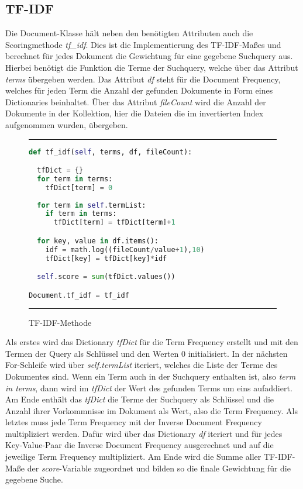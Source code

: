 \subsection{TF-IDF}\label{tf-idf}

Die Document-Klasse hält neben den benötigten Attributen auch die Scoringmethode \textit{tf\_idf}. Dies ist die Implementierung des TF-IDF-Maßes und berechnet für jedes Dokument die Gewichtung für eine gegebene Suchquery aus. Hierbei benötigt die Funktion die Terme der Suchquery, welche über das Attribut \textit{terms} übergeben werden. Das Attribut \textit{df} steht für die Document Frequency, welches für jeden Term die Anzahl der gefunden Dokumente in Form eines Dictionaries beinhaltet. Über das Attribut \textit{fileCount} wird die Anzahl der Dokumente in der Kollektion, hier die Dateien die im invertierten Index aufgenommen wurden, übergeben.

\begin{figure}[h]
	\rule{\textwidth}{0.4pt}
		\begin{lstlisting}[language=Python]
def tf_idf(self, terms, df, fileCount):

  tfDict = {}
  for term in terms:
    tfDict[term] = 0  
  
  for term in self.termList:
    if term in terms:
      tfDict[term] = tfDict[term]+1

  for key, value in df.items():
    idf = math.log((fileCount/value+1),10)
    tfDict[key] = tfDict[key]*idf

  self.score = sum(tfDict.values())

Document.tf_idf = tf_idf
		\end{lstlisting}
	\rule{\textwidth}{0.4pt}
	\caption{TF-IDF-Methode}
	\label{fig:tfidf}
\end{figure}

Als erstes wird das Dictionary \textit{tfDict} für die Term Frequency erstellt und mit den Termen der Query als Schlüssel und den Werten 0 initialisiert. In der nächsten For-Schleife wird über \textit{self.termList} iteriert, welches die Liste der Terme des Dokumentes sind. Wenn ein Term auch in der Suchquery enthalten ist, also \textit{term in terms}, dann wird im \textit{tfDict} der Wert des gefunden Terms um eins aufaddiert. Am Ende enthält das \textit{tfDict} die Terme der Suchquery als Schlüssel und die Anzahl ihrer Vorkommnisse im Dokument als Wert, also die Term Frequency. Als letztes muss jede Term Frequency mit der Inverse Document Frequency multipliziert werden. Dafür wird über das Dictionary \textit{df} iteriert und für jedes Key-Value-Paar die Inverse Document Frequency ausgerechnet und auf die jeweilige Term Frequency multipliziert. Am Ende wird die Summe aller TF-IDF-Maße der \textit{score}-Variable zugeordnet und bilden so die finale Gewichtung für die gegebene Suche.

